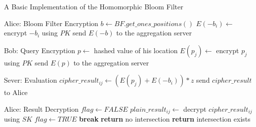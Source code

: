 \begin{algorithm}\small
\caption{A Basic Implementation of the Homomorphic Bloom Filter}
\label{alg1}
\begin{algorithmic}[1]

\Statex Alice: Bloom Filter Encryption
\State $b \gets BF.get\_ones\_positions()$
    \State $E(-b_i) \gets$ encrypt $-b_i$ using $PK$
\EndFor
\State send $E(-b)$ to the aggregation server

\item[]

\Statex Bob: Query Encryption
\State $p \gets$ hashed value of his location
    \State $E(p_j) \gets$ encrypt $p_j$ using $PK$
\EndFor
\State send $E(p)$ to the aggregation server

\item[]

\Statex Sever: Evaluation
        \State $cipher\_result_{ij} \gets (E(p_j) + E(-b_i))*z$
    \EndFor
\EndFor
\State send $cipher\_result$ to Alice

\item[]

\Statex Alice: Result Decryption
    \State $flag \gets FALSE$
        \State $plain\_result_{ij} \gets$ decrypt $cipher\_result_{ij}$ using $SK$
            \State $flag \gets TRUE$
            \State \textbf{break}
        \EndIf
    \EndFor
        \State \textbf{return} no intersection
    \EndIf
\EndFor
\State \textbf{return} intersection exists

\end{algorithmic}
\end{algorithm}



